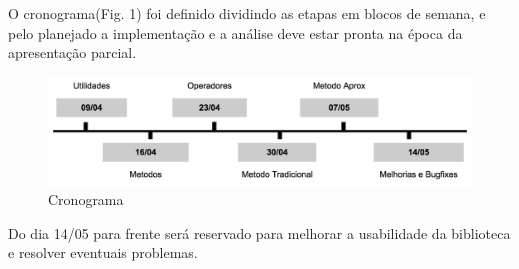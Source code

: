%

O cronograma(Fig. 1) foi definido dividindo as etapas em blocos de semana, e pelo planejado a implementação e a análise deve estar pronta na época da apresentação parcial.

\begin{figure}[h]
\centering
\includegraphics[width=\textwidth]{roadmap.png}
\caption{Cronograma}
\end{figure}

Do dia 14/05 para frente será reservado para melhorar a usabilidade da biblioteca e resolver eventuais problemas.
